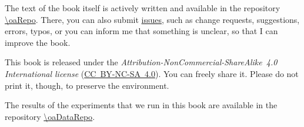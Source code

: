 The text of the book itself is actively written and available in the repository \url{\oaRepo}.
There, you can also submit \href{\oaRepo/issues}{issues}, such as change requests, suggestions, errors, typos, or you can inform me that something is unclear, so that I can improve the book.

This book is released under the \emph{Attribution-NonCommercial-ShareAlike~4.0 International license} (\href{http://creativecommons.org/licenses/by-nc-sa/4.0/}{\mbox{CC~BY-NC-SA~4.0}}).
You can freely share it.
Please do not print it, though, to preserve the environment.

The results of the experiments that we run in this book are available in the repository \url{\oaDataRepo}.

